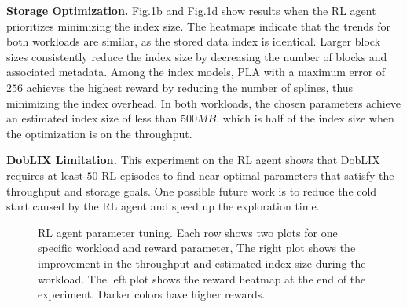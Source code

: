 \noindent
\textbf{Storage Optimization.} Fig.\hyperref[fig:eval-rl]{\ref*{fig:eval-rl}b} and Fig.\hyperref[fig:eval-rl]{\ref*{fig:eval-rl}d} show results when the RL agent prioritizes minimizing the index size. The heatmaps indicate that the trends for both workloads are similar, as the stored data index is identical. Larger block sizes consistently reduce the index size by decreasing the number of blocks and associated metadata. Among the index models, PLA with a maximum error of $256$ achieves the highest reward by reducing the number of splines, thus minimizing the index overhead. In both workloads, the chosen parameters achieve an estimated index size of less than $500MB$, which is half of the index size when the optimization is on the throughput.

\noindent
\textbf{DobLIX Limitation.} This experiment on the RL agent shows that DobLIX requires at least $50$ RL episodes to find near-optimal parameters that satisfy the throughput and storage goals. One possible future work is to reduce the cold start caused by the RL agent and speed up the exploration time.




\begin{figure}[t]
  \centering
  \vspace{-2em}
  \caption{\small{RL agent parameter tuning. Each row shows two plots for one specific workload and reward parameter, The right plot shows the improvement in the throughput and estimated index size during the workload. The left plot shows the reward heatmap at the end of the experiment. Darker colors have higher rewards.}}
  \label{fig:eval-rl}
  \vspace{-1.5em}
\end{figure}

